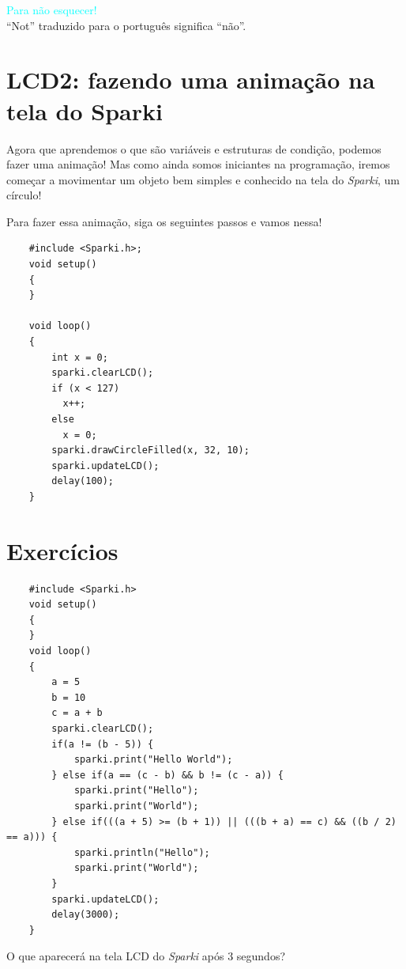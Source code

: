     \begin{center}
        \textcolor{cyan}{Para não esquecer!}
        \\``Not'' traduzido para o português significa ``não''.
    \end{center}

\section{LCD2: fazendo uma animação na tela do Sparki}

    Agora que aprendemos o que são variáveis e estruturas de condição, podemos fazer uma animação! Mas como ainda somos iniciantes na programação, iremos começar a movimentar um objeto bem simples e conhecido na tela do \textsl{Sparki}, um círculo!\par
    Para fazer essa animação, siga os seguintes passos e vamos nessa!
    
    \begin{verbatim}
    #include <Sparki.h>;
    void setup()
    {
    }
    
    void loop()
    {
        int x = 0;
        sparki.clearLCD();
        if (x < 127)
          x++;
        else
          x = 0;
        sparki.drawCircleFilled(x, 32, 10);
        sparki.updateLCD();
        delay(100);
    }
    \end{verbatim}

\section{Exercícios}


    \begin{verbatim}
    #include <Sparki.h>
    void setup()
    {
    }
    void loop()
    {
        a = 5
        b = 10
        c = a + b
        sparki.clearLCD();
        if(a != (b - 5)) {
            sparki.print("Hello World");
        } else if(a == (c - b) && b != (c - a)) {
            sparki.print("Hello");
            sparki.print("World");
        } else if(((a + 5) >= (b + 1)) || (((b + a) == c) && ((b / 2) == a))) {
            sparki.println("Hello");
            sparki.print("World");
        }
        sparki.updateLCD();
        delay(3000);
    }
    \end{verbatim}
    
    O que aparecerá na tela LCD do \textsl{Sparki} após 3 segundos?

